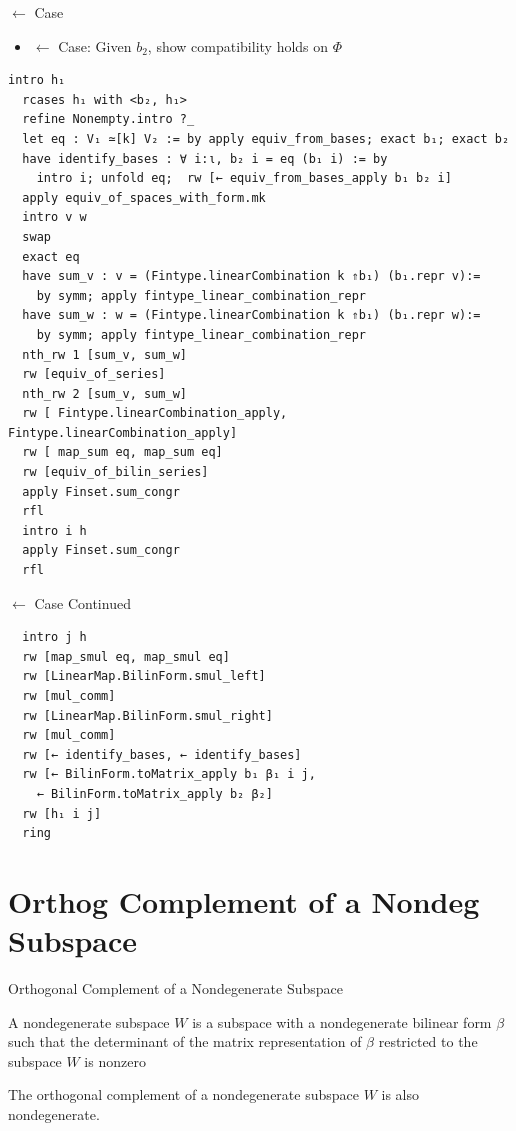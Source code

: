 \documentclass[svgnames]{beamer}
\begin{document}
\begin{frame}[label={sec:proof_comparison},fragile]{$\leftarrow$ Case}

\begin{itemize}
    \item $\leftarrow$ Case: Given $b_2$, show compatibility holds on $\Phi$
\end{itemize}
{\tiny
\begin{verbatim}
intro h₁
  rcases h₁ with <b₂, h₁>
  refine Nonempty.intro ?_
  let eq : V₁ ≃[k] V₂ := by apply equiv_from_bases; exact b₁; exact b₂
  have identify_bases : ∀ i:ι, b₂ i = eq (b₁ i) := by 
    intro i; unfold eq;  rw [← equiv_from_bases_apply b₁ b₂ i]
  apply equiv_of_spaces_with_form.mk
  intro v w
  swap
  exact eq
  have sum_v : v = (Fintype.linearCombination k ⇑b₁) (b₁.repr v):= 
    by symm; apply fintype_linear_combination_repr
  have sum_w : w = (Fintype.linearCombination k ⇑b₁) (b₁.repr w):= 
    by symm; apply fintype_linear_combination_repr
  nth_rw 1 [sum_v, sum_w]  
  rw [equiv_of_series]
  nth_rw 2 [sum_v, sum_w]
  rw [ Fintype.linearCombination_apply, Fintype.linearCombination_apply]
  rw [ map_sum eq, map_sum eq]
  rw [equiv_of_bilin_series]
  apply Finset.sum_congr
  rfl
  intro i h
  apply Finset.sum_congr
  rfl
\end{verbatim}
}
\end{frame}

\begin{frame}[label={sec:proof_comparison},fragile]{$\leftarrow$ Case Continued}
\begin{itemize}
\end{itemize}
\footnotesize{
\begin{verbatim}
  intro j h
  rw [map_smul eq, map_smul eq]
  rw [LinearMap.BilinForm.smul_left]
  rw [mul_comm]
  rw [LinearMap.BilinForm.smul_right]
  rw [mul_comm]
  rw [← identify_bases, ← identify_bases]
  rw [← BilinForm.toMatrix_apply b₁ β₁ i j,
    ← BilinForm.toMatrix_apply b₂ β₂] 
  rw [h₁ i j]
  ring
\end{verbatim}
}


\end{frame}

\section{Orthog Complement of a Nondeg Subspace}

\begin{frame}{Orthogonal Complement of a Nondegenerate Subspace}
\begin{Definition}
A nondegenerate subspace $W$ is a subspace with a nondegenerate bilinear form $\beta$ such that the determinant of the matrix representation of $\beta$ restricted to the subspace $W$ is nonzero
\end{Definition}
\begin{Theorem}
The orthogonal complement of a nondegenerate subspace $W$ is also nondegenerate.
\end{Theorem}
\end{frame}
\end{document}
